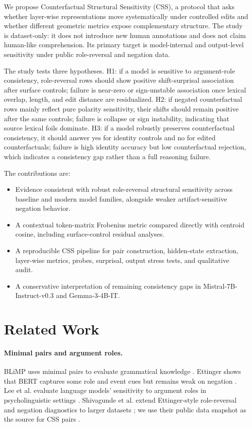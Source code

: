 \documentclass{article}
\begin{document}
We propose Counterfactual Structural Sensitivity (CSS), a protocol that asks whether layer-wise representations move systematically under controlled edits and whether different geometric metrics expose complementary structure. The study is dataset-only: it does not introduce new human annotations and does not claim human-like comprehension. Its primary target is model-internal and output-level sensitivity under public role-reversal and negation data.

The study tests three hypotheses. H1: if a model is sensitive to argument-role consistency, role-reversal rows should show positive shift-surprisal association after surface controls; failure is near-zero or sign-unstable association once lexical overlap, length, and edit distance are residualized. H2: if negated counterfactual rows mainly reflect pure polarity sensitivity, their shifts should remain positive after the same controls; failure is collapse or sign instability, indicating that source lexical foils dominate. H3: if a model robustly preserves counterfactual consistency, it should answer yes for identity controls and no for edited counterfactuals; failure is high identity accuracy but low counterfactual rejection, which indicates a consistency gap rather than a full reasoning failure.

The contributions are:
\begin{itemize}
    \item Evidence consistent with robust role-reversal structural sensitivity across baseline and modern model families, alongside weaker artifact-sensitive negation behavior.
    \item A contextual token-matrix Frobenius metric compared directly with centroid cosine, including surface-control residual analyses.
    \item A reproducible CSS pipeline for pair construction, hidden-state extraction, layer-wise metrics, probes, surprisal, output stress tests, and qualitative audit.
    \item A conservative interpretation of remaining consistency gaps in Mistral-7B-Instruct-v0.3 and Gemma-3-4B-IT.
\end{itemize}

\section{Related Work}

\paragraph{Minimal pairs and argument roles.}
BLiMP uses minimal pairs to evaluate grammatical knowledge \cite{warstadt2020blimp}. Ettinger shows that BERT captures some role and event cues but remains weak on negation \cite{ettinger2020bert}. Lee et al. evaluate language models' sensitivity to argument roles in psycholinguistic settings \cite{lee2024argumentroles}. Shivagunde et al. extend Ettinger-style role-reversal and negation diagnostics to larger datasets \cite{shivagunde2023larger}; we use their public data snapshot as the source for CSS pairs \cite{textmachinelab2023datasetrepo}.
\end{document}
